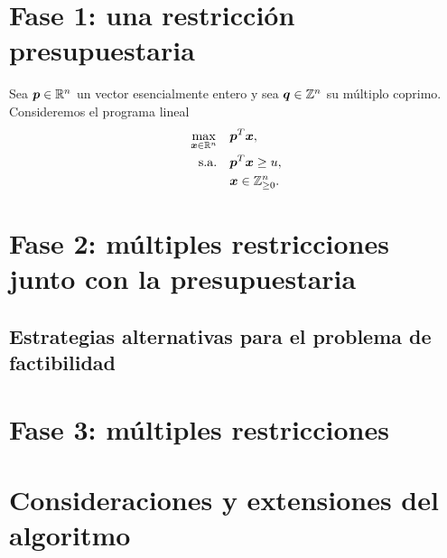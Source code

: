 
\section{Fase 1: una restricción presupuestaria}

\noindent
Sea $\boldsymbol{p} \in \mathbb{R}^n$ un vector esencialmente entero y sea $\boldsymbol{q} \in \mathbb{Z}^n$ su múltiplo coprimo.
Consideremos el programa lineal 
\begin{subequations}
	\label{phase-1:formulation}
	\begin{align}
		\max_{\boldsymbol{x} \in \mathbb{R}^n} \quad
			& \boldsymbol{p}^T\boldsymbol{x}, \label{phase-1:formulation:obj} \\
		\text{s.a.} \quad
			& \boldsymbol{p}^T\boldsymbol{x} \geq u, \label{phase-1:formulation:c_1} \\
			& \boldsymbol{x} \in \mathbb{Z}_{\geq 0}^n. \nonumber
	\end{align}
\end{subequations}

\section{Fase 2: múltiples restricciones junto con la presupuestaria}
\subsection{Estrategias alternativas para el problema de factibilidad}
\section{Fase 3: múltiples restricciones}
\section{Consideraciones y extensiones del algoritmo}
